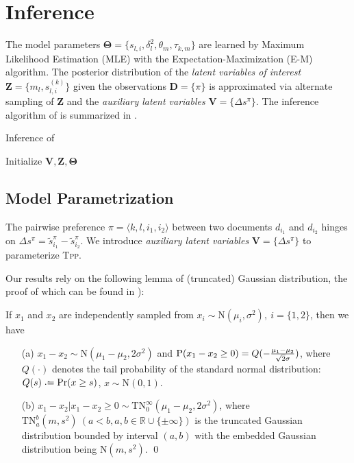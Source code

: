 \section{Inference}  \label{sec::tpp_infer}

The model parameters $\mathbf{\Theta} = \{ s_{l,i}, \delta_l^2, \theta_m,
\tau_{k,m}\}$ are learned by Maximum Likelihood Estimation (MLE) with the
Expectation-Maximization (E-M)~\cite{dempster1977maximum} algorithm.  The
posterior distribution of the \textit{latent variables of interest} $\mathbf{Z}
= \{m_l, s_{l,i}^{(k)}\}$ given the observations $\mathbf{D} = \{\pi\}$ is
approximated via alternate sampling of $\mathbf{Z}$ and the \textit{auxiliary
latent variables} $\mathbf{V}  = \{\Delta s^{\pi}\}$.  The inference algorithm
of \tpp{} is summarized in .

\begin{algorithm}[h!]
\caption{Inference of \tpp{}}\label{alg::tpp}
	Initialize $\mathbf{V}, \mathbf{Z}, \mathbf{\Theta}$\;
\end{algorithm}

\subsection{Model Parametrization}
The pairwise preference $\pi = \langle k, l, i_1, i_2 \rangle$ between two
documents $d_{i_1}$ and $d_{i_2}$ hinges on $\Delta s^\pi =
\tilde{s}_{i_1}^{\pi} - \tilde{s}_{i_2}^{\pi}$.  We introduce \textit{auxiliary
latent variables} $\mathbf{V}  = \{\Delta s^{\pi}\}$  to parameterize
\textsc{Tpp}.

Our results rely on the following lemma of (truncated) Gaussian distribution,
the proof of which can be found in \cite{chopin2011fast}):
\begin{lem}\label{lem::gaussian_diff}
If $x_1$ and $x_2$ are independently sampled from $x_i \sim \mathrm{N}(\mu_i,
\sigma^2),~i=\{1,2\}$,  then we have
\begin{itemize}
\item[(a)] $x_1 - x_2 \sim \mathrm{N}(\mu_1 - \mu_2, 2\sigma^2)$
  and  $\P(x_1 - x_2 \geq 0) = Q(-\frac{\mu_1-\mu_2}{\sqrt{2}\sigma})$, where
  $Q(\cdot)$ denotes the tail probability of the standard normal distribution:
  $Q(s) \defeq \Pr(x \geq s)$, $x\sim \mathrm{N}(0, 1)$.
\item[(b)] $x_1 - x_2 | x_1 - x_2 \geq 0 \sim \mathrm{TN}_0^{\infty}(\mu_1 -
  \mu_2, 2\sigma^2)$, where $\mathrm{TN}_a^{b}(m, s^2) ~(a<b, a, b \in
  \mathbb{R} \cup \{\pm \infty\})$ is the truncated Gaussian distribution
  bounded by interval $(a, b)$ with the embedded Gaussian distribution being
  $\mathrm{N}(m, s^2)$.
\qed
\end{itemize}
\end{lem}


